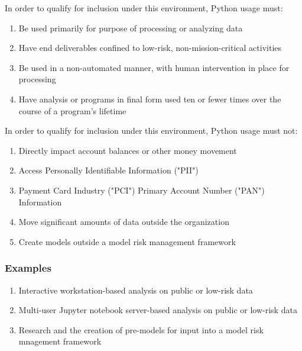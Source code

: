			In order to qualify for inclusion under this environment, Python usage must:

			\begin{enumerate}
                \item Be used primarily for purpose of processing or analyzing data
        		\item Have end deliverables confined to low-risk, non-mission-critical activities
        		\item Be used in a non-automated manner, with human intervention in place for processing
        		\item Have analysis or programs in final form used ten or fewer times over the course of a program's lifetime
        	\end{enumerate}

			In order to qualify for inclusion under this environment, Python usage must not:

			\begin{enumerate}
        		\item Directly impact account balances or other money movement
        		\item Access Personally Identifiable Information ("PII")
        		\item Payment Card Industry ("PCI") Primary Account Number ("PAN") Information
        		\item Move significant amounts of data outside the organization
        		\item Create models outside a model risk management framework
        	\end{enumerate}

		\subsubsection{Examples}

			\begin{enumerate}
        		\item Interactive workstation-based analysis on public or low-risk data
        		\item Multi-user Jupyter notebook server-based analysis on public or low-risk data
        		\item Research and the creation of pre-models for input into a model risk mnagement framework
        	\end{enumerate}



